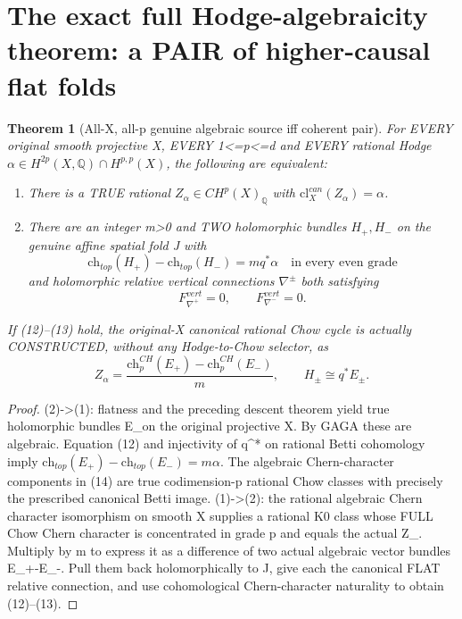 \documentclass[11pt]{article}
\newtheorem{theorem}{Theorem}
\begin{document}
\section{The exact full Hodge-algebraicity theorem: a PAIR of higher-causal flat folds}
\begin{theorem}[All-X, all-p genuine algebraic source iff coherent pair]
For EVERY original smooth projective X,
EVERY 1<=p<=d and EVERY rational Hodge
$\alpha\in H^{2p}(X,\mathbb Q)\cap H^{p,p}(X)$,
the following are equivalent:
\begin{enumerate}
\item There is a TRUE rational
$Z_\alpha\in CH^p(X)_{\mathbb Q}$
with $\mathrm{cl}^{can}_X(Z_\alpha)=\alpha$.
\item There are an integer m>0 and TWO
holomorphic bundles $H_+,H_-$ on the genuine
affine spatial fold J with
\[
 \boxed{\mathrm{ch}_{top}(H_+)
        -\mathrm{ch}_{top}(H_-)=m q^*\alpha
           \quad\text{in every even grade}}
 \tag{12}
\]
and holomorphic relative vertical
connections $\nabla^\pm$ both satisfying
\[
 \boxed{F_{\nabla^+}^{vert}=0,\qquad
        F_{\nabla^-}^{vert}=0.}                 \tag{13}
\]
\end{enumerate}
If (12)--(13) hold, the original-X
canonical rational Chow cycle is
actually CONSTRUCTED, without any
Hodge-to-Chow selector, as
\[
 \boxed{
 Z_\alpha=
 \frac{\mathrm{ch}^{CH}_p(E_+)
       -\mathrm{ch}^{CH}_p(E_-)}{m},
 \qquad H_\pm\cong q^*E_\pm.
 }                                                       \tag{14}
\]
\end{theorem}
\begin{proof}
(2)->(1): flatness and the preceding
descent theorem yield true holomorphic
bundles E_\pm on the original projective X.
By GAGA these are algebraic. Equation
(12) and injectivity of q^* on rational
Betti cohomology imply
$\mathrm{ch}_{top}(E_+)
 -\mathrm{ch}_{top}(E_-)=m\alpha$.
The algebraic Chern-character components
in (14) are true codimension-p
rational Chow classes with precisely
the prescribed canonical Betti image.
(1)->(2): the rational algebraic
Chern character isomorphism on smooth X
supplies a rational K0 class whose
FULL Chow Chern character is concentrated
in grade p and equals the actual Z_\alpha.
Multiply by m to express it as a
difference of two actual algebraic
vector bundles E_+-E_-.
Pull them back holomorphically to J,
give each the canonical FLAT relative
connection, and use cohomological
Chern-character naturality to obtain
(12)--(13).
\end{proof}
\end{document}
